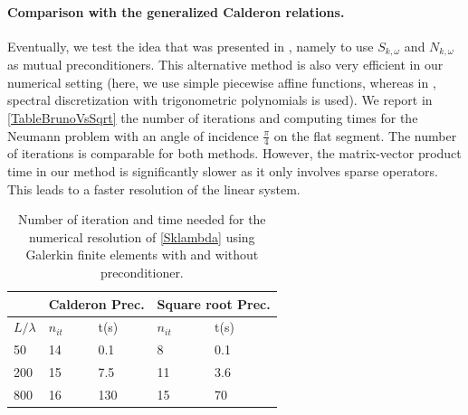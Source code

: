 \documentclass[a4paper]{article}
\begin{document}
\paragraph{Comparison with the generalized Calderon relations.} Eventually, we test the idea that was presented in \cite{bruno2012second}, namely 
to use $S_{k,\omega}$ and $N_{k,\omega}$ as mutual preconditioners. This alternative method is also very efficient in our numerical setting (here, we use 
simple piecewise affine functions, whereas in \cite{bruno2012second}, spectral discretization with trigonometric polynomials is used). We report in 
\autoref{TableBrunoVsSqrt} the number of iterations and computing times for the Neumann problem with an angle of incidence $\frac{\pi}{4}$ on the 
flat segment. The number of iterations is comparable for both methods. However, the matrix-vector product time in our method is significantly 
slower as it only involves sparse operators. This leads to a faster resolution of the linear system. 

\begin{table}[H]
	\begin{center}
		\begin{tabular}{m{4em} | m{4em} | m{4em} | m{4em} | m{4em}} 
			\hline
			\multicolumn{1}{c|}{ }&
			\multicolumn{2}{c|}{Calderon Prec.}&\multicolumn{2}{c}{Square root Prec.}\\
			\hline
			$L/\lambda$ & $n_{it}$& t(s) & $n_{it}$ & t(s)\\
			\hline\hline
			50 & 14 & 0.1 & 8 & 0.1\\
			\hline
			200 & 15 & 7.5 & 11 &  3.6\\
			\hline
			800 & 16 & 130 & 15 & 70\\
			\hline
		\end{tabular}
	\end{center}
	\caption{Number of iteration and time needed for the numerical resolution of \eqref{Sklambda} using Galerkin finite elements with and without preconditioner.}
	\label{TableBrunoVsSqrt}
\end{table}
	
\end{document}
